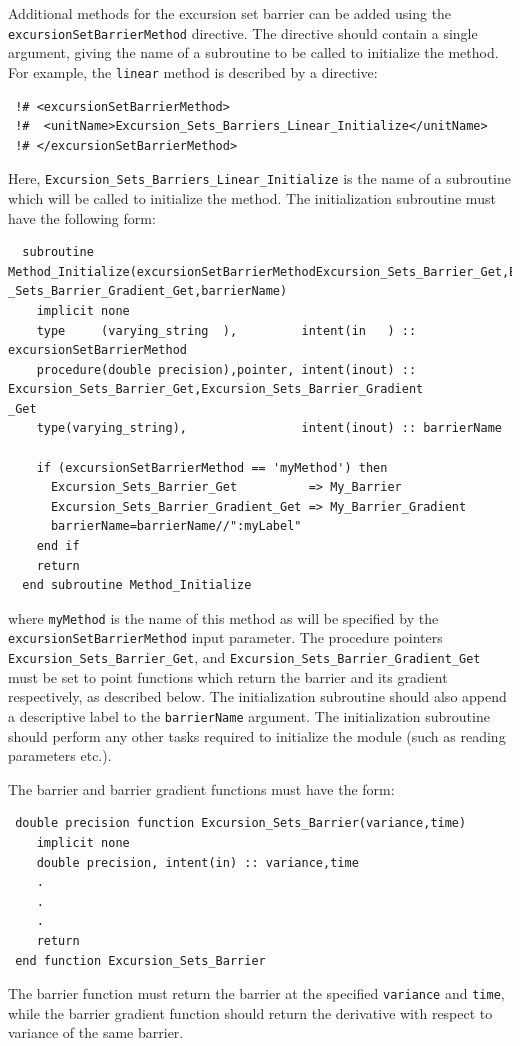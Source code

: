Additional methods for the excursion set barrier can be added using the {\tt excursionSetBarrierMethod} directive. The directive should contain a single argument, giving the name of a subroutine to be called to initialize the method. For example, the {\tt linear} method is described by a directive:
\begin{verbatim}
 !# <excursionSetBarrierMethod>
 !#  <unitName>Excursion_Sets_Barriers_Linear_Initialize</unitName>
 !# </excursionSetBarrierMethod>
\end{verbatim}
Here, {\tt Excursion\_Sets\_Barriers\_Linear\_Initialize} is the name of a subroutine which will be called to initialize the method. The initialization subroutine must have the following form:
\begin{verbatim}
  subroutine Method_Initialize(excursionSetBarrierMethodExcursion_Sets_Barrier_Get,Excursion
_Sets_Barrier_Gradient_Get,barrierName)
    implicit none
    type     (varying_string  ),         intent(in   ) :: excursionSetBarrierMethod
    procedure(double precision),pointer, intent(inout) :: Excursion_Sets_Barrier_Get,Excursion_Sets_Barrier_Gradient
_Get
    type(varying_string),                intent(inout) :: barrierName

    if (excursionSetBarrierMethod == 'myMethod') then
      Excursion_Sets_Barrier_Get          => My_Barrier
      Excursion_Sets_Barrier_Gradient_Get => My_Barrier_Gradient
      barrierName=barrierName//":myLabel"
    end if
    return
  end subroutine Method_Initialize
\end{verbatim}
where {\tt myMethod} is the name of this method as will be specified by the {\tt excursionSetBarrierMethod} input parameter. The procedure pointers {\tt Excursion\_Sets\_Barrier\_Get}, and {\tt Excursion\_Sets\_Barrier\_Gradient\_Get} must be set to point functions which return the barrier and its gradient respectively, as described below. The initialization subroutine should also append a descriptive label to the {\tt barrierName} argument. The initialization subroutine should perform any other tasks required to initialize the module (such as reading parameters etc.).

The barrier and barrier gradient functions must have the form:
\begin{verbatim}
 double precision function Excursion_Sets_Barrier(variance,time)
    implicit none
    double precision, intent(in) :: variance,time
    .
    .
    .
    return
 end function Excursion_Sets_Barrier
\end{verbatim}
The barrier function must return the barrier at the specified {\tt variance} and {\tt time}, while the barrier gradient function should return the derivative with respect to variance of the same barrier.

